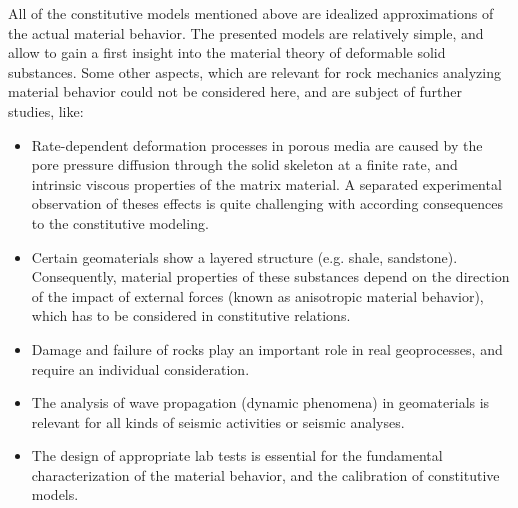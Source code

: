 \vspace{4.0ex}
All of the constitutive models mentioned above are idealized approximations of the actual material behavior. The presented models are relatively simple, and allow to gain a first insight into the material theory of deformable solid substances. Some other aspects, which are relevant for rock mechanics analyzing material behavior could not be considered here, and are subject of further studies, like:
\begin{itemize}
\item Rate-dependent deformation processes in porous media are caused by the pore pressure diffusion through the solid skeleton at a finite rate, and intrinsic viscous properties of the matrix material. A separated experimental observation of theses effects is quite challenging with according consequences to the constitutive modeling.
\item Certain geomaterials show a layered structure (e.g. shale, sandstone). Consequently, material properties of these substances depend on the direction of the impact of external forces (known as anisotropic material behavior), which has to be considered in constitutive relations.
\item Damage and failure of rocks play an important role in real geoprocesses, and require an individual consideration.
\item The analysis of wave propagation (dynamic phenomena) in geomaterials is relevant for all kinds of seismic activities or seismic analyses.
\item The design of appropriate lab tests is essential for the fundamental characterization of the material behavior, and the calibration of constitutive models.
\end{itemize}
